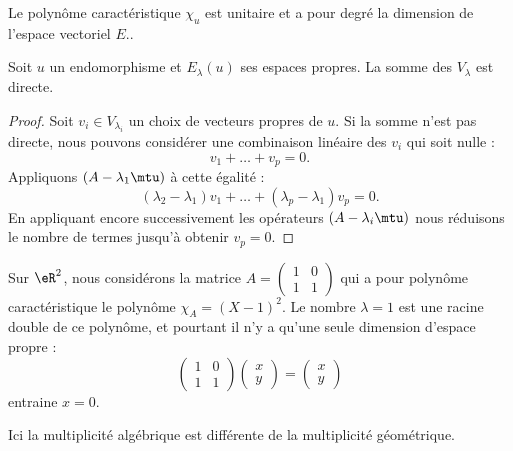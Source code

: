 \begin{lemma}
    Le polynôme caractéristique \( \chi_u\) est unitaire et a pour degré la dimension de l'espace vectoriel \( E\)..
\end{lemma}

\begin{lemma}       \label{LemjcztYH}
    Soit \( u\) un endomorphisme et \( E_{\lambda}(u)\) ses espaces propres. La somme des \( V_{\lambda}\) est directe.
\end{lemma}

\begin{proof}
    Soit \( v_i\in V_{\lambda_i}\) un choix de vecteurs propres de \( u\). Si la somme n'est pas directe, nous pouvons considérer une combinaison linéaire des \( v_i\) qui soit nulle :
    \begin{equation}
        v_1+\ldots+v_p=0.
    \end{equation}
    Appliquons \( (A-\lambda_1\mtu)\) à cette égalité :
    \begin{equation}
        (\lambda_2-\lambda_1)v_1+\ldots+(\lambda_p-\lambda_1)v_p=0.
    \end{equation}
    En appliquant encore successivement les opérateurs \( (A-\lambda_i\mtu)\) nous réduisons le nombre de termes jusqu'à obtenir \( v_p=0\).
\end{proof}

\begin{example} \label{ExICOJcFp}
    Sur \( \eR^2\), nous considérons la matrice \( A=\begin{pmatrix}
        1    &   0    \\ 
        1    &   1    
    \end{pmatrix}\) qui a pour polynôme caractéristique le polynôme \( \chi_A=(X-1)^2\). Le nombre \( \lambda=1\) est une racine double de ce polynôme, et pourtant il n'y a qu'une seule dimension d'espace propre :
    \begin{equation}
        \begin{pmatrix}
            1    &   0    \\ 
            1    &   1    
        \end{pmatrix}\begin{pmatrix}
            x    \\ 
            y    
        \end{pmatrix}=\begin{pmatrix}
            x    \\ 
            y    
        \end{pmatrix}
    \end{equation}
    entraine \( x=0\).

    Ici la multiplicité algébrique est différente de la multiplicité géométrique.
\end{example}

